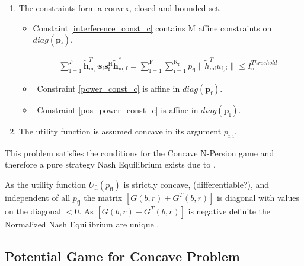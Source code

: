 \documentclass[12pt,a4paper]{report}
\begin{document}
\begin{enumerate}

\item
The constraints form a convex, closed and bounded set. 

\begin{itemize}

\item
	Constaint \eqref{interference_const_c} contains $\text{M}$ affine constraints on $diag(\mathbf{p_{\mathrm{f}}})$.

\begin{gather*}
	  \sum^F_{\text{f}=1} \mathbf{\tilde{h}}_{\mathrm{m,f}}^T  \mathbf{s}_{\mathrm{f}} 						
	\mathbf{s_{\mathrm{f}}^{\mathrm{H}}} \mathbf{\tilde{h}_{\mathrm{m,f}}^*} 
	=
	\sum_{\mathrm{f=1}}^{\mathrm{F}}	\sum_{\mathrm{i=1}}^{\mathrm{K_f}}
	p_{\mathrm{fi}}\|\tilde{h}_{\mathrm{mf}}^T u_{\mathrm{f,i}}\|
	\leq I^{Threshold}_{\mathrm{m}} 
\end{gather*}

\item \
	Constraint \eqref{power_const_c} is  affine in $diag(\mathbf{p_{\mathrm{f}}})$.
	
\item \
	Constraint \eqref{pos_power_const_c} is affine in $diag(\mathbf{p_{\mathrm{f}}})$.
\end{itemize}


\item The utility function is assumed concave in its argument $p_{\mathrm{f,i}}$.

\end{enumerate}

This problem satisfies the conditions for the Concave N-Persion game and therefore a pure strategy Nash Equilibrium exists due to 
\cite[Thm1]{rosen1964existence}.

As the utility function $U_{\mathrm{fi}}(p_{\mathrm{fi}})$ is strictly concave, (differentiable?), and independent of all $p_{\mathrm{fj}}$ the matrix $[G(b,r)+G^{T}(b,r)] $ is diagonal with values on the diagonal $<0$. As $[G(b,r)+G^{T}(b,r)] $ is negative definite the Normalized Nash Equilibrium are unique \cite[Thm4]{rosen1964existence}.

\subsection{Potential Game for Concave Problem}
\end{document}

